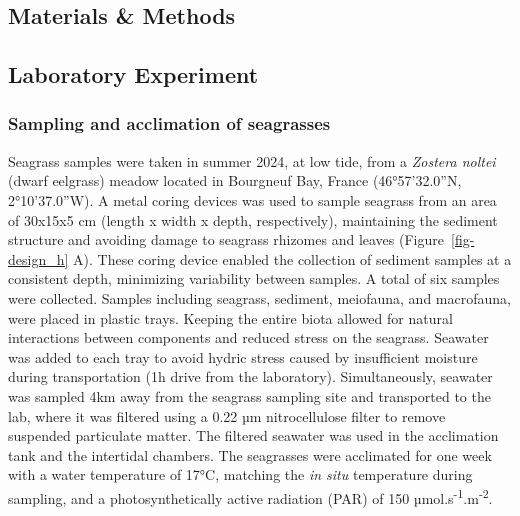 \documentclass[
  letterpaper,
  11pt,
  english,
  singlespacing,
  headsepline]{MastersDoctoralThesis}
\begin{document}
\begin{spacing}{1.5}
\section{Materials \& Methods}\label{materials-methods-2}

\subsection{Laboratory Experiment}\label{laboratory-experiment}

\subsubsection{Sampling and acclimation of
seagrasses}\label{sampling-and-acclimation-of-seagrasses}

Seagrass samples were taken in summer 2024, at low tide, from a
\emph{Zostera noltei} (dwarf eelgrass) meadow located in Bourgneuf Bay,
France (46°57'32.0''N, 2°10'37.0''W). A metal coring devices was used to
sample seagrass from an area of 30x15x5 cm (length x width x depth,
respectively), maintaining the sediment structure and avoiding damage to
seagrass rhizomes and leaves (Figure~\ref{fig-design_h} A). These coring
device enabled the collection of sediment samples at a consistent depth,
minimizing variability between samples. A total of six samples were
collected. Samples including seagrass, sediment, meiofauna, and
macrofauna, were placed in plastic trays. Keeping the entire biota
allowed for natural interactions between components and reduced stress
on the seagrass. Seawater was added to each tray to avoid hydric stress
caused by insufficient moisture during transportation (1h drive from the
laboratory). Simultaneously, seawater was sampled 4km away from the
seagrass sampling site and transported to the lab, where it was filtered
using a 0.22 µm nitrocellulose filter to remove suspended particulate
matter. The filtered seawater was used in the acclimation tank and the
intertidal chambers. The seagrasses were acclimated for one week with a
water temperature of 17°C, matching the \emph{in situ} temperature
during sampling, and a photosynthetically active radiation (PAR) of 150
µmol.s\textsuperscript{-1}.m\textsuperscript{-2}.

\begin{figure}

\centering{

}
\end{figure}
\end{spacing}
\end{document}
